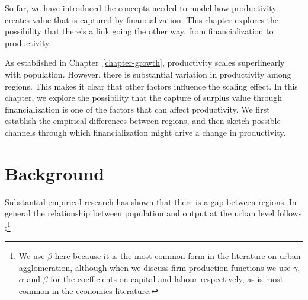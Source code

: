 






So far, we have introduced the concepts needed to model %
how productivity creates value that is captured by financialization. %
This chapter explores the possibility that there's a link going the other way, from financialization to productivity. 

As established in Chapter~\ref{chapter-growth}, productivity scales superlinearly with population. %
However, there is substantial variation in productivity among regions.  This makes it clear that other factors influence the scaling effect. In this chapter, we explore the possibility that the capture of surplus value through financialization is one of the factors that can affect  productivity. We first establish the empirical differences between regions, and then sketch possible channels through which financialization might drive a change in productivity. 


\section{Background}\label{sec-fig-residuals}

Substantial empirical research has shown that there is a gap between regions. In general the relationship between population and output at the urban level follows \cite{loboUrbanScalingProduction2013}:\footnote{We use $\beta$ here because it is the most common form in the literature on urban agglomeration, although when we discuss firm production functions we use $\gamma$, $\alpha$ and $\beta$ for the coefficients on capital and labour respectively, as is most common in the economics literature.}

